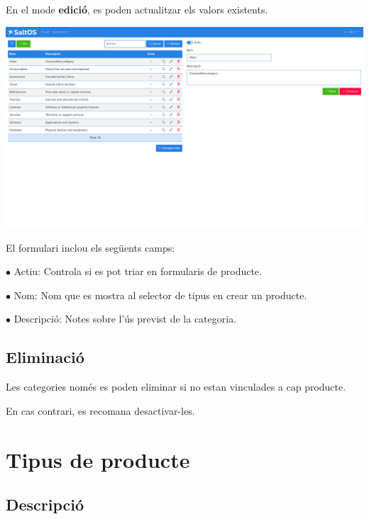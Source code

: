 \documentclass[a4paper]{article}
\begin{document}
En el mode \textbf{edició}, es poden actualitzar els valors existents.

\begin{center}\includegraphics[width=1\textwidth]{../ujest/snaps/test-screenshots-js-screenshots-sales-products-categories-edit-10-ca-es-1-snap.png}\end{center}

El formulari inclou els següents camps:

\begin{compactitem}
\item[\color{myblue}$\bullet$] Actiu: Controla si es pot triar en formularis de producte.
\item[\color{myblue}$\bullet$] Nom: Nom que es mostra al selector de tipus en crear un producte.
\item[\color{myblue}$\bullet$] Descripció: Notes sobre l’ús previst de la categoria.
\end{compactitem}

\hypertarget{toc160}{}
\subsection{Eliminació}

Les categories només es poden eliminar si no estan vinculades a cap producte.

En cas contrari, es recomana desactivar-les.


\hypertarget{toc161}{}
\section{Tipus de producte}

\hypertarget{toc162}{}
\subsection{Descripció}
\end{document}
